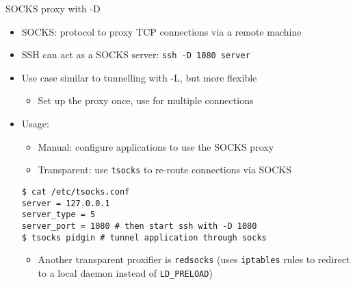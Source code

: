 \documentclass[11pt,final,usepdftitle=false]{beamer}
\begin{document}
\begin{frame}[fragile]{SOCKS proxy with -D}
\begin{itemize}
\item SOCKS: protocol to proxy TCP connections via a remote machine
\hbr
\item SSH can act as a SOCKS server: \texttt{ssh -D 1080 server}
\hbr
\item Use case similar to tunnelling with -L, but more flexible
	\begin{itemize}
		\item Set up the proxy once, use for multiple connections
	\end{itemize}
\hbr
\item Usage:
\begin{itemize}
\item Manual: configure applications to use the SOCKS proxy
\hbr
\item Transparent: use \texttt{tsocks} to re-route connections via SOCKS
\end{itemize}
\begin{lstlisting}[basicstyle=\ttfamily\small,escapeinside={||}]
$ cat /etc/tsocks.conf
server = 127.0.0.1
server_type = 5
server_port = 1080 # then start ssh with -D 1080
$ tsocks pidgin # tunnel application through socks
\end{lstlisting}
\begin{itemize}
	\item Another transparent proxifier is \texttt{redsocks} (uses \texttt{iptables} rules to redirect to a local daemon instead of \texttt{LD\_PRELOAD})
\end{itemize}
\end{itemize}
\end{frame}
\end{document}
